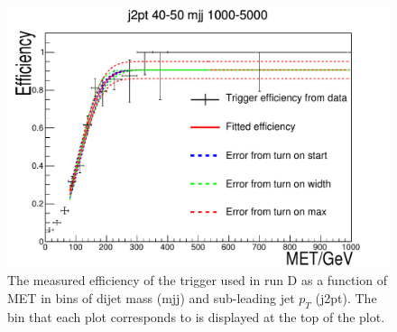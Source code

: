 \begin{figure}[h!]
\begin{center}
    \includegraphics[width=.6\largefigwidth]{plots/parked/trigfitplots/hData_MET_1D_25D.pdf}
    \caption{The measured efficiency of the trigger used in run D as a function of MET in bins of dijet mass (mjj) and sub-leading jet $p_{T}$ (j2pt). The bin that each plot corresponds to is displayed at the top of the plot.}
    \label{fig:trigfitplotsD1}
  \end{center}
\end{figure}

